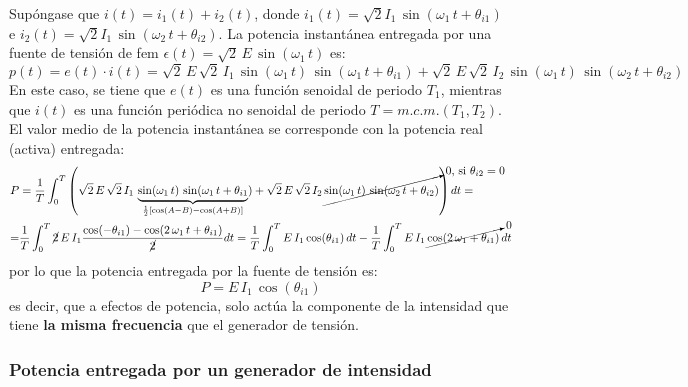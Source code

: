     Supóngase que $i(t) = i_1(t) + i_2(t)$, donde $i_1(t)=\sqrt{2}I_{1}\,\sin(\omega_1\,t+\theta_{i1})$ e $i_2(t)=\sqrt{2}I_{1}\,\sin(\omega_2\,t+\theta_{i2})$. La potencia instantánea entregada por una fuente de tensión de fem $\epsilon(t)=\sqrt{2}\,E\,\sin(\omega_1\,t)$ es:
\begin{equation*}
  p(t) = e(t)\cdot i(t) = \sqrt{2}\,E\, \sqrt{2}\,I_{1}\,\sin(\omega_1\,t)\,\sin(\omega_1\,t+\theta_{i1}) +\sqrt{2}\,E\, \sqrt{2}\,I_{2}\,\sin(\omega_1\,t)\,\sin(\omega_2\,t+\theta_{i2})
\end{equation*} 
En este caso, se tiene que $e(t)$ es una función senoidal de periodo $T_1$, mientras que $i(t)$ es una función periódica no senoidal de periodo $T=m.c.m.(T_1,T_2)$. El valor medio de la potencia instantánea se corresponde con la potencia real (activa) entregada:
\begin{align*}
    P&=\dfrac{1}{T}\int_0^{T}\left( \sqrt{2}\,E\,\sqrt{2}\, I_{1}\,\underbrace{\sin(\omega_1\,t)\,\sin(\omega_1\,t+\theta_{i1}}_{\frac{1}{2}\left[\cos(A-B)-\cos(A+B)\right]}) + \sqrt{2}\,E\,\sqrt{2}\, I_{2}\,\cancelto{\text{0, si $\theta_{i2}=0$}}{\sin(\omega_1\,t)\,\sin(\omega_2\,t+\theta_{i2})}\right)dt=\\
    =&\dfrac{1}{T}\int_0^T \cancel{2}\,E\,I_{1}\dfrac{\cos(-\theta_{i1})-\cos(2\,\omega_1\,t+\theta_{i1})}{\cancel{2}}dt =\dfrac{1}{T}\int_0^T E\,I_{1}\,{\cos(\theta_{i1})}\,dt-\dfrac{1}{T}\int_0^T E\,I_{1}\,\cancelto{0}{{\cos(2\,\omega_1+\theta_{i1})}}\,dt
\end{align*}
por lo que la potencia entregada por la fuente de tensión es:
\begin{equation}\label{eq.P_E_superposicion}
    \boxed{P=E\,I_1\,\cos(\theta_{i1})}
\end{equation}
es decir, que a efectos de potencia, solo actúa la componente de la intensidad que tiene \textbf{la misma frecuencia} que el generador de tensión.

\subsubsection{Potencia entregada por un generador de intensidad}

